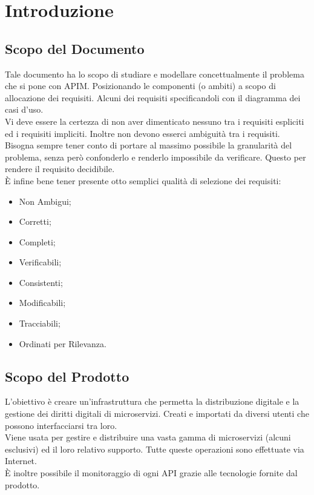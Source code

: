 \documentclass[12pt,a4paper,titlepage]{article}
\begin{document}
	\section{Introduzione}
	\subsection{Scopo del Documento}
	Tale documento ha lo scopo di studiare e modellare concettualmente il problema che si pone con APIM. Posizionando le componenti (o ambiti) a scopo di allocazione dei requisiti. Alcuni dei requisiti specificandoli con il diagramma dei casi d'uso.\\
	Vi deve essere la certezza di non aver dimenticato nessuno tra i requisiti espliciti ed i requisiti impliciti. Inoltre non devono esserci ambiguità tra i requisiti.
	Bisogna sempre tener conto di portare al massimo possibile la granularità del problema, senza però confonderlo e renderlo impossibile da verificare. Questo per rendere il requisito decidibile.\\
	È infine bene tener presente otto semplici qualità di selezione dei requisiti:
	\begin{itemize}
		\item Non Ambigui;
		\item Corretti;
		\item Completi;
		\item Verificabili;
		\item Consistenti;
		\item Modificabili;
		\item Tracciabili;
		\item Ordinati per Rilevanza.
	\end{itemize}
	\subsection{Scopo del Prodotto}
	L'obiettivo è creare un'infrastruttura che permetta la distribuzione digitale e la gestione dei diritti digitali di microservizi. Creati e importati da diversi utenti che possono interfacciarsi tra loro.\\
	Viene usata per gestire e distribuire una vasta gamma di microservizi (alcuni esclusivi) ed il loro relativo supporto. Tutte queste operazioni sono effettuate via Internet.\\
	È inoltre possibile il monitoraggio di ogni API grazie alle tecnologie fornite dal prodotto.\\
	
\end{document}
